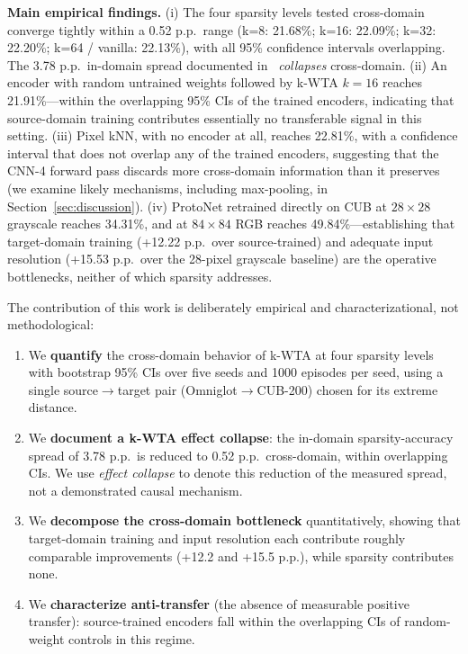 \documentclass[11pt]{article}
\begin{document}
\textbf{Main empirical findings.} (i) The four sparsity levels tested cross-domain converge tightly within a 0.52 p.p.\ range (k=8: 21.68\%; k=16: 22.09\%; k=32: 22.20\%; k=64 / vanilla: 22.13\%), with all 95\% confidence intervals overlapping. The 3.78 p.p.\ in-domain spread documented in~\citet{pinho2026kwta} \emph{collapses} cross-domain. (ii) An encoder with random untrained weights followed by k-WTA $k=16$ reaches 21.91\%---within the overlapping 95\% CIs of the trained encoders, indicating that source-domain training contributes essentially no transferable signal in this setting. (iii) Pixel kNN, with no encoder at all, reaches 22.81\%, with a confidence interval that does not overlap any of the trained encoders, suggesting that the CNN-4 forward pass discards more cross-domain information than it preserves (we examine likely mechanisms, including max-pooling, in Section~\ref{sec:discussion}). (iv) ProtoNet retrained directly on CUB at $28 \times 28$ grayscale reaches 34.31\%, and at $84 \times 84$ RGB reaches 49.84\%---establishing that target-domain training (+12.22 p.p.\ over source-trained) and adequate input resolution (+15.53 p.p.\ over the 28-pixel grayscale baseline) are the operative bottlenecks, neither of which sparsity addresses.

The contribution of this work is deliberately empirical and characterizational, not methodological:

\begin{enumerate}
    \item We \textbf{quantify} the cross-domain behavior of k-WTA at four sparsity levels with bootstrap 95\% CIs over five seeds and 1000 episodes per seed, using a single source$\to$target pair (Omniglot$\to$CUB-200) chosen for its extreme distance.
    \item We \textbf{document a k-WTA effect collapse}: the in-domain sparsity-accuracy spread of 3.78 p.p.\ is reduced to 0.52 p.p.\ cross-domain, within overlapping CIs. We use \emph{effect collapse} to denote this reduction of the measured spread, not a demonstrated causal mechanism.
    \item We \textbf{decompose the cross-domain bottleneck} quantitatively, showing that target-domain training and input resolution each contribute roughly comparable improvements (+12.2 and +15.5 p.p.), while sparsity contributes none.
    \item We \textbf{characterize anti-transfer} (the absence of measurable positive transfer): source-trained encoders fall within the overlapping CIs of random-weight controls in this regime.
\end{enumerate}
\end{document}
